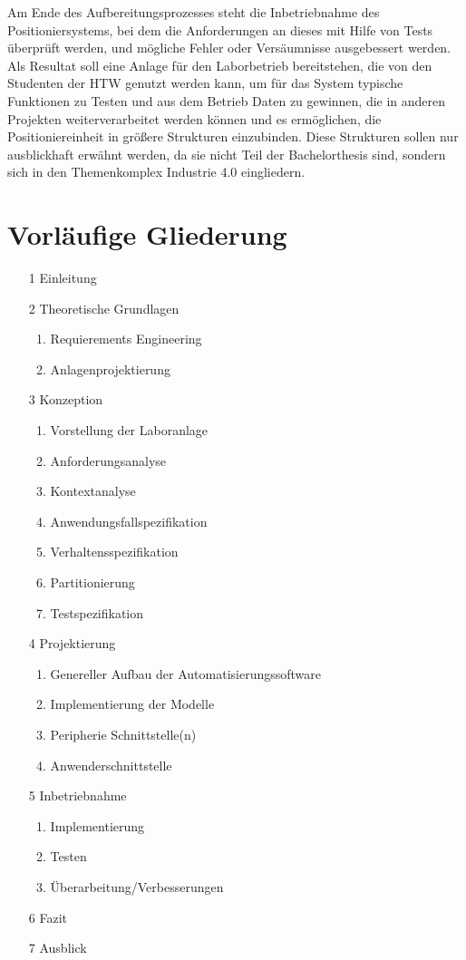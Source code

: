\documentclass[12pt, a4paper, twoside]{article} %
\begin{document}
Am Ende des Aufbereitungsprozesses steht die Inbetriebnahme des Positioniersystems, bei dem die Anforderungen an dieses mit Hilfe von Tests überprüft werden, und mögliche Fehler oder Versäumnisse ausgebessert werden. Als Resultat soll eine Anlage für den Laborbetrieb bereitstehen, die von den Studenten der HTW genutzt werden kann, um für das System typische Funktionen zu Testen und aus dem Betrieb Daten zu gewinnen, die in anderen Projekten weiterverarbeitet werden können und es ermöglichen, die Positioniereinheit in größere Strukturen einzubinden. Diese Strukturen sollen nur ausblickhaft erwähnt werden, da sie nicht Teil der Bachelorthesis sind, sondern sich in den Themenkomplex Industrie 4.0 eingliedern.

\section{Vorläufige Gliederung}
\begin{itemize}
	\item[1] Einleitung
	\item[2] Theoretische Grundlagen
	\begin{enumerate}[label*=\arabic*.]
		\item Requierements Engineering
		\item Anlagenprojektierung
	\end{enumerate}
	\item[3] Konzeption
	\begin{enumerate}[label*=\arabic*.]
		\item Vorstellung der Laboranlage
		\item Anforderungsanalyse
		\item Kontextanalyse
		\item Anwendungsfallspezifikation
		\item Verhaltensspezifikation
		\item Partitionierung
		\item Testspezifikation
	\end{enumerate}
	\item[4] Projektierung
	\begin{enumerate}[label*=\arabic*.]
		\item Genereller Aufbau der Automatisierungssoftware
		\item Implementierung der Modelle
		\item Peripherie Schnittstelle(n)
		\item Anwenderschnittstelle
	\end{enumerate}
	\item[5] Inbetriebnahme
	\begin{enumerate}[label*=\arabic*.]
		\item Implementierung
		\item Testen
		\item Überarbeitung/Verbesserungen
	\end{enumerate} 
	\item[6] Fazit
	\item[7] Ausblick
\end{itemize}
\end{document}
